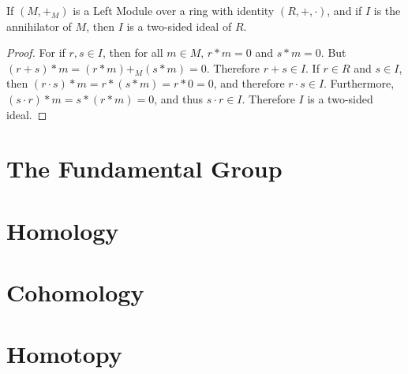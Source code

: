 \documentclass[crop=false,class=book,oneside]{standalone}
\begin{document}
        \begin{theorem}
            If $(M,+_{M})$ is a Left Module over a ring with
            identity $(R,+,\cdot)$, and if $I$ is the
            annihilator of $M$, then $I$ is a two-sided
            ideal of $R$.
        \end{theorem}
        \begin{proof}
            For if $r,s\in{I}$, then for all $m\in{M}$,
            $r*m=0$ and $s*m=0$. But $(r+s)*m=(r*m)+_{M}(s*m)=0$.
            Therefore $r+s\in{I}$. If $r\in{R}$ and $s\in{I}$,
            then $(r\cdot{s})*m=r*(s*m)=r*0=0$, and therefore
            $r\cdot{s}\in{I}$. Furthermore,
            $(s\cdot{r})*m=s*(r*m)=0$, and thus $s\cdot{r}\in{I}$.
            Therefore $I$ is a two-sided ideal.
        \end{proof}
        
    \section{The Fundamental Group}
    \section{Homology}
    \section{Cohomology}
    \section{Homotopy}
\end{document}
